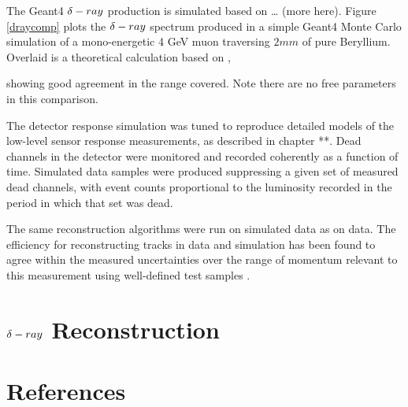 \documentclass[review]{elsarticle}
\def\deltaray{\ensuremath{{\rm \delta}-ray}\xspace}
\begin{document}
The Geant4 \deltaray production is simulated based on … (more here).  Figure
\ref{draycomp} plots the \deltaray spectrum produced in a simple Geant4 Monte
Carlo simulation of a mono-energetic 4 GeV muon traversing $2 mm$ of pure
Beryllium.  Overlaid is a theoretical calculation based on \cite{drtheory},

showing good agreement in the range covered.  Note there are no free parameters
in this comparison.

The \babar detector response simulation was tuned to reproduce detailed models
of the low-level sensor response measurements, as described in \cite{babarnim2} chapter **.
Dead channels in the detector were monitored and recorded coherently as a
function of time.  Simulated data samples were produced suppressing a given set
of measured dead channels, with event counts proportional to the luminosity
recorded in the period in which that set was dead.

The same reconstruction algorithms were run on simulated data as on \babar
data.  The efficiency for reconstructing tracks in \babar data and simulation
has been found to agree within the measured uncertainties over the range of
momentum relevant to this measurement using well-defined test samples
\cite{trackeff}.

\section{\deltaray Reconstruction}



\section*{References}


\end{document}
